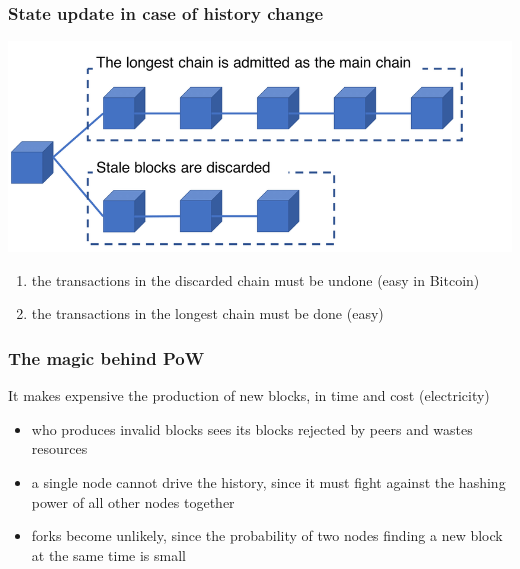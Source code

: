 \documentclass[11pt]{beamer}  %
\begin{document}
\begin{frame}\frametitle{State update in case of history change}

    \begin{center}
      \includegraphics[width=\textwidth,clip=false]{pictures/longest.png}
    \end{center}

    \begin{enumerate}
    \item the transactions in the discarded chain must be undone (easy in Bitcoin)
    \item the transactions in the longest chain must be done (easy)
    \end{enumerate}
    
\end{frame}

\begin{frame}\frametitle{The magic behind PoW}

  \begin{greenbox}{}
    It makes expensive the production of new blocks, in time and cost (electricity)
    \begin{itemize}
    \item who produces invalid blocks sees its blocks rejected by peers and wastes resources
    \item a single node cannot drive the history, since it must fight against
      the hashing power of all other nodes together
    \item forks become unlikely, since the probability of two nodes finding a new block at the same time
      is small
    \end{itemize}
  \end{greenbox}

\end{frame}
\end{document}
